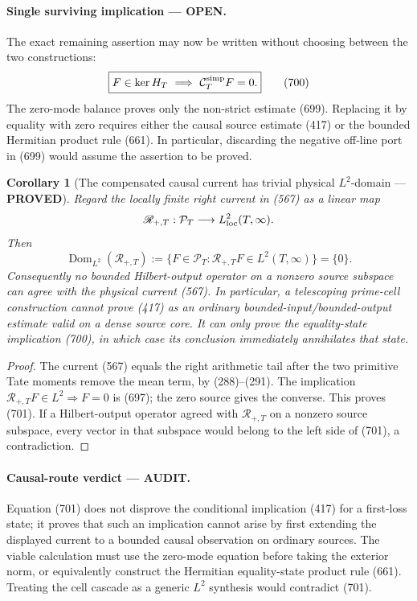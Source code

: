 \documentclass[11pt]{article}
\newtheorem{corollary}[theorem]{Corollary}
\newcommand{\PROVED}{\textcolor{green!45!black}{\textbf{PROVED}}}
\newcommand{\OPEN}{\textcolor{red!70!black}{\textbf{OPEN}}}
\newcommand{\AUDIT}{\textcolor{orange!75!black}{\textbf{AUDIT}}}
\begin{document}
\paragraph{Single surviving implication --- \OPEN.}
The exact remaining assertion may now be written without choosing between
the two constructions:
\begin{equation}
 \boxed{F\in\ker H_T\ \Longrightarrow\
        \mathcal C_T^{\rm simp}F=0.}                 \tag{700}
\end{equation}
The zero-mode balance proves only the non-strict estimate (699).  Replacing
it by equality with zero requires either the causal source estimate (417)
or the bounded Hermitian product rule (661).  In particular, discarding the
negative off-line port in (699) would assume the assertion to be proved.

\begin{corollary}[The compensated causal current has trivial physical
\(L^2\)-domain --- \PROVED]
Regard the locally finite right current in (567) as a linear map
\[
 \mathscr R_{+,T}:\mathcal P_T\longrightarrow
 L^2_{\rm loc}(T,\infty).
\]
Then
\begin{equation}
 \operatorname{Dom}_{L^2}(\mathscr R_{+,T})
 :=\{F\in\mathcal P_T:\mathscr R_{+,T}F\in L^2(T,\infty)\}
 =\{0\}.                                             \tag{701}
\end{equation}
Consequently no bounded Hilbert-output operator on a nonzero source
subspace can agree with the physical current (567).  In particular, a
telescoping prime-cell construction cannot prove (417) as an ordinary
bounded-input/bounded-output estimate valid on a dense source core.
It can only prove the equality-state implication (700), in which case its
conclusion immediately annihilates that state.
\end{corollary}

\begin{proof}
The current (567) equals the right arithmetic tail after the two primitive
Tate moments remove the mean term, by (288)--(291).  The implication
\(\mathscr R_{+,T}F\in L^2\Rightarrow F=0\) is (697); the zero source gives
the converse.  This proves (701).  If a Hilbert-output operator agreed with
\(\mathscr R_{+,T}\) on a nonzero source subspace, every vector in that
subspace would belong to the left side of (701), a contradiction.
\end{proof}

\paragraph{Causal-route verdict --- \AUDIT.}
Equation (701) does not disprove the conditional implication (417) for a
first-loss state; it proves that such an implication cannot arise by first
extending the displayed current to a bounded causal observation on ordinary
sources.  The viable calculation must use the zero-mode equation before
taking the exterior norm, or equivalently construct the Hermitian
equality-state product rule (661).  Treating the cell cascade as a generic
\(L^2\) synthesis would contradict (701).
\end{document}
